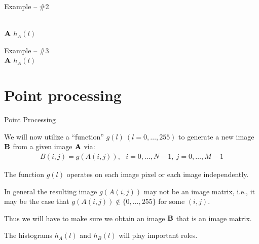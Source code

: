 %
%
\begin{slide}{Example -- \#2}

\\
\centering
${\bf A}$ \hspace{0.4\textwidth} $h_A(l)$

\end{slide}

%
%
\begin{slide}{Example -- \#3}
\hypertarget{origlenna}{
}\\
\centering
${\bf A}$ \hspace{0.4\textwidth} $h_A(l)$

\end{slide}

\section{Point processing}
%
%
\begin{slide}{Point Processing}
\begin{titlelist}{}{}
\small
\item<2-> 
We will now utilize a ``function'' $g(l)\ (l=0,\ldots,255)$
to generate a new image ${\bf B}$ from a given image ${\bf A}$
via:
{\scriptsize
\begin{eqnarray}
B(i,j)=g\left(A(i,j)\right),\ \ \ i=0,\ldots,N-1,\ j=0,\ldots,M-1
\end{eqnarray}
}
\item<3-> 
The function $g(l)$ operates on each image pixel
or each image  independently.

\item<4-> 
In general the resulting image $g(A(i,j))$ may not
be an image matrix, i.e., it may be the case that
$g(A(i,j)) \not\in \{0,\ldots,255\}$ for some $(i,j)$.

\item<5-> 
Thus we will have to make sure we obtain an image ${\bf B}$
that is an image matrix.

\item<6-> 
The histograms $h_A(l)$ and $h_B(l)$ will play important
roles.

\end{titlelist}
\end{slide}

